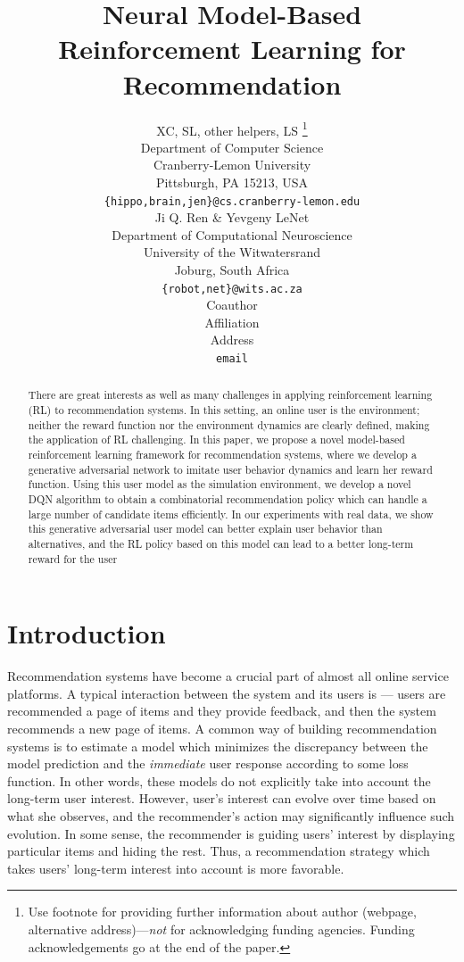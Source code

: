 \documentclass{article} %
\title{Neural Model-Based Reinforcement Learning for Recommendation}
\author{
XC, SL, other helpers, LS
\thanks{ Use footnote for providing further information
about author (webpage, alternative address)---\emph{not} for acknowledging
funding agencies.  Funding acknowledgements go at the end of the paper.} \\
Department of Computer Science\\
Cranberry-Lemon University\\
Pittsburgh, PA 15213, USA \\
\texttt{\{hippo,brain,jen\}@cs.cranberry-lemon.edu} \\
\And
Ji Q. Ren \& Yevgeny LeNet \\
Department of Computational Neuroscience \\
University of the Witwatersrand \\
Joburg, South Africa \\
\texttt{\{robot,net\}@wits.ac.za} \\
\AND
Coauthor \\
Affiliation \\
Address \\
\texttt{email}
}
\newcommand{\xinshi}[1]{{\color{black}{#1}}}
\begin{document}
\maketitle

\begin{abstract}
 There are great interests as well as many challenges in applying reinforcement learning (RL) to recommendation systems. In this setting, an online user is the environment; neither the reward function nor the environment dynamics are clearly defined, making the application of RL challenging. 
 In this paper, we propose a novel model-based reinforcement learning framework for recommendation systems, where we develop a generative adversarial network to imitate user behavior dynamics and learn her reward function. Using this user model as the simulation environment, we develop a novel DQN algorithm to obtain a combinatorial recommendation policy which can handle a large number of candidate items efficiently. In our experiments with real data, we show this generative adversarial user model can better explain user behavior than alternatives, and the RL policy based on this model can lead to a better long-term reward for the user \xinshi{and higher click rate for the system.}
\end{abstract}

\vspace{-3mm}
\section{Introduction}
\vspace{-3mm}
        \setlength{\abovedisplayskip}{4pt}
        \setlength{\abovedisplayshortskip}{1pt}
        \setlength{\belowdisplayskip}{4pt}
        \setlength{\belowdisplayshortskip}{1pt}
        \setlength{\jot}{3pt}
        \setlength{\textfloatsep}{6pt}	

Recommendation systems have become a crucial part of almost all online service platforms. A typical interaction between the
system and its users is --- users are recommended a page of items
and they provide feedback, and then the system recommends a new
page of items. A common way of building recommendation systems is to estimate a model which minimizes the discrepancy between the model prediction and the \emph{immediate} user response according to some loss function. In other words, these models do not explicitly take into account the long-term user interest. However, user's interest can evolve over time based on what she observes, and the recommender's action may significantly influence such evolution. In some sense, the recommender is guiding users' interest by displaying particular items and hiding the rest. Thus, a recommendation strategy which takes users' long-term interest into account is more favorable.
\end{document}
